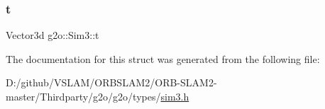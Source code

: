 \mbox{\label{structg2o_1_1_sim3_a3ef879fb13b88732428bd2f2a558d11c}} 
\subsubsection{\texorpdfstring{t}{t}}
{\footnotesize\ttfamily Vector3d g2o\+::\+Sim3\+::t\hspace{0.3cm}{\ttfamily [protected]}}



The documentation for this struct was generated from the following file\+:\begin{DoxyCompactItemize}
\item 
D\+:/github/\+V\+S\+L\+A\+M/\+O\+R\+B\+S\+L\+A\+M2/\+O\+R\+B-\/\+S\+L\+A\+M2-\/master/\+Thirdparty/g2o/g2o/types/\mbox{\hyperlink{sim3_8h}{sim3.\+h}}\end{DoxyCompactItemize}
